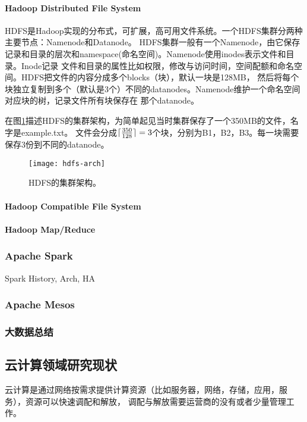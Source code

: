 \paragraph*{Hadoop Distributed File System}
HDFS是Hadoop实现的分布式，可扩展，高可用文件系统。一个HDFS集群分两种主要节点：Namenode和Datanode。
HDFS集群一般有一个Namenode，由它保存记录和目录的层次和namespace(命名空间)。Namenode使用inodes表示文件和目录。Inode记录
文件和目录的属性比如权限，修改与访问时间，空间配额和命名空间。HDFS把文件的内容分成多个blocks（块），默认一块是128MB，
然后将每个块独立复制到多个（默认是3个）不同的datanodes。Namenode维护一个命名空间对应块的树，记录文件所有块保存在
那个datanode。

在图\ref{fig:hdfs-arch}描述HDFS的集群架构，为简单起见当时集群保存了一个350MB的文件，名字是example.txt。
文件会分成$\lceil\frac{350}{128}\rceil = 3$个块，分别为B1，B2，B3。每一块需要保存3份到不同的datanode。

\begin{figure}
  \centering
    \texttt{[image: hdfs-arch]}
    \caption{HDFS的集群架构。}
  \label{fig:hdfs-arch}
\end{figure}


\paragraph*{Hadoop Compatible File System}

\paragraph*{Hadoop Map/Reduce}


\subsubsection{Apache Spark}
\label{subsubsec:spark}
Spark History, Arch, HA

\subsubsection{Apache Mesos}


\subsubsection{大数据总结}

\subsection{云计算领域研究现状}
\label{subsec:cloud_background}
云计算是通过网络按需求提供计算资源（比如服务器，网络，存储，应用，服务），资源可以快速调配和解放，
调配与解放需要运营商的没有或者少量管理工作。


